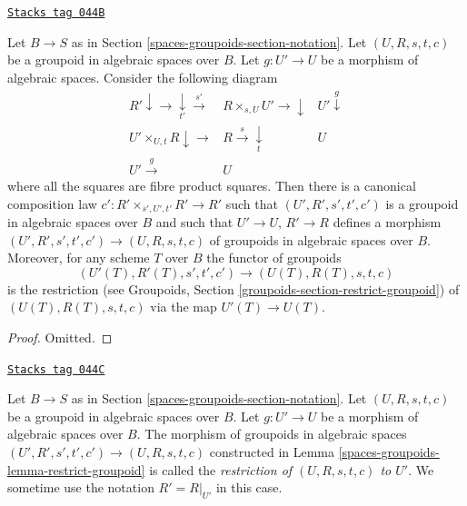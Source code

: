 \begin{lemma}
\label{spaces-groupoids-lemma-restrict-groupoid}
\href{https://stacks.math.columbia.edu/tag/044B}{\texttt{Stacks tag 044B}}

Let $B \to S$ as in Section \ref{spaces-groupoids-section-notation}.
Let $(U, R, s, t, c)$ be a groupoid in algebraic spaces over $B$.
Let $g : U' \to U$ be a morphism of algebraic spaces.
Consider the following diagram
$$
\begin{array}{ccc}R' \downarrow\longrightarrow\underset{t'}{\downarrow}\overset{s'}{\longrightarrow} & R \times_{s, U} U' \longrightarrow\downarrow & U' \overset{g}{\downarrow} \\ U' \times_{U, t} R \downarrow\longrightarrow & R \overset{s}{\longrightarrow}\underset{t}{\downarrow} & U \\ U' \overset{g}{\longrightarrow} & U & \end{array}
$$
where all the squares are fibre product squares. Then there is a
canonical composition law $c' : R' \times_{s', U', t'} R' \to R'$
such that $(U', R', s', t', c')$ is a groupoid in algebraic spaces over
$B$ and such that $U' \to U$, $R' \to R$ defines a morphism
$(U', R', s', t', c') \to (U, R, s, t, c)$ of groupoids in algebraic spaces
over $B$. Moreover, for any scheme $T$ over $B$ the functor of groupoids
$$
(U'(T), R'(T), s', t', c') \to (U(T), R(T), s, t, c)
$$
is the restriction (see
Groupoids, Section \ref{groupoids-section-restrict-groupoid})
of $(U(T), R(T), s, t, c)$ via the map $U'(T) \to U(T)$.
\end{lemma}

\begin{proof}
Omitted.
\end{proof}

\begin{definition}
\label{spaces-groupoids-definition-restrict-groupoid}
\href{https://stacks.math.columbia.edu/tag/044C}{\texttt{Stacks tag 044C}}

Let $B \to S$ as in Section \ref{spaces-groupoids-section-notation}.
Let $(U, R, s, t, c)$ be a groupoid in algebraic spaces over $B$.
Let $g : U' \to U$ be a morphism of algebraic spaces over $B$.
The morphism of groupoids in algebraic spaces
$(U', R', s', t', c') \to (U, R, s, t, c)$
constructed in Lemma \ref{spaces-groupoids-lemma-restrict-groupoid} is called
the {\it restriction of $(U, R, s, t, c)$ to $U'$}.
We sometime use the notation $R' = R|_{U'}$ in this case.
\end{definition}

